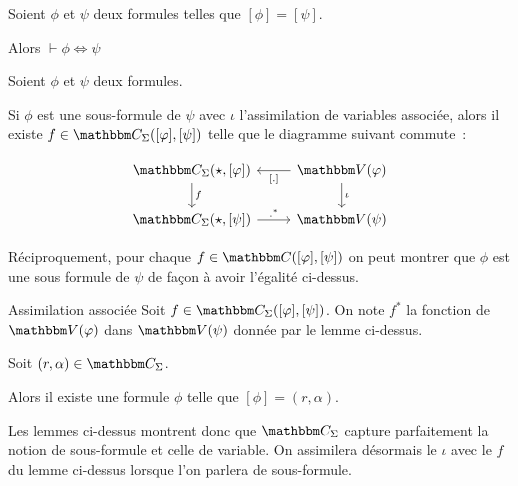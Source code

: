 \begin{lem}
    Soient $\phi$ et $\psi$ deux formules telles que $[\phi] = [\psi]$.

    Alors $\vdash \phi\iff\psi$
\end{lem}

\begin{lem}
    Soient $\phi$ et $\psi$ deux formules.
    
    Si $\phi$ est une sous-formule de $\psi$ avec $\iota$ l'assimilation de
    variables associée, alors il existe $f\in\C_\Sigma([\phi], [\psi])$ telle
    que le diagramme suivant commute~:



    \[\begin{tikzcd}
        \C_\Sigma(\star,[\phi]) \arrow[d, "f"] & \V(\phi) \arrow[d, "\iota"]
                                                          \arrow[l, "\brk{.}"] \\
        \C_\Sigma(\star,[\psi]) \arrow[r, ".^*"] & \V(\psi)
    \end{tikzcd}\]

    Réciproquement, pour chaque $f\in\C([\phi], [\psi])$ on peut montrer que $\phi$ est
    une sous formule de $\psi$ de façon à avoir l'égalité ci-dessus.
\end{lem}

\begin{defi}{Assimilation associée}
    Soit $f\in\C_\Sigma([\phi],[\psi])$. On note $f^*$ la fonction de $\V(\phi)$ dans
    $\V(\psi)$ donnée par le lemme ci-dessus.
\end{defi}

\begin{lem}
    Soit $(r,\alpha)\in\C_\Sigma$.

    Alors il existe une formule $\phi$ telle que $[\phi] = (r,\alpha)$.
\end{lem}

Les lemmes ci-dessus montrent donc que $\C_\Sigma$ capture parfaitement la notion de
sous-formule et celle de variable. On assimilera désormais le $\iota$ avec le $f$ du
lemme ci-dessus lorsque l'on parlera de sous-formule.

